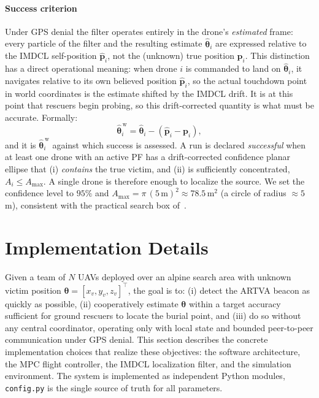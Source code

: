 \documentclass[journal,10pt,twocolumn]{IEEEtran}
\begin{document}
\paragraph{Success criterion}
Under GPS denial the filter operates entirely in the drone's
\emph{estimated} frame: every particle of the filter and the resulting estimate
$\hat{\bm{\theta}}_i$ are expressed relative to the IMDCL self-position
$\hat{\mathbf{p}}_i$, not the (unknown) true position $\mathbf{p}_i$.
This distinction has a direct operational meaning: when drone $i$ is
commanded to land on $\hat{\bm{\theta}}_i$, it navigates relative to
its own believed position $\hat{\mathbf{p}}_i$, so the actual touchdown
point in world coordinates is the estimate shifted by the
IMDCL drift.  It is at this point that rescuers begin probing, so
this drift-corrected quantity is what must be accurate.  Formally:
\begin{equation}
  \hat{\bm{\theta}}_i^{\,\mathrm{w}} =
  \hat{\bm{\theta}}_i - (\hat{\mathbf{p}}_i - \mathbf{p}_i),
  \label{eq:drift_correct}
\end{equation}
and it is $\hat{\bm{\theta}}_i^{\,\mathrm{w}}$ against which success is
assessed.  A run is declared \emph{successful} when at least one drone
with an active PF has a drift-corrected confidence planar ellipse that
(i) \emph{contains} the true victim,
and (ii) is sufficiently concentrated, $A_i \le A_{\max}$.  A single drone
is therefore enough to localize the source.  We set the confidence level
to $95\%$ and $A_{\max} = \pi\,(5\,\mathrm{m})^2 \approx 78.5\,\mathrm{m}^2$
(a circle of radius $\approx 5$\,m), consistent with the practical search
box of~\cite{Azzollini2021}.

\section{Implementation Details}
\label{sec:impl}

Given a team of $N$ UAVs deployed over an alpine search area with
unknown victim position $\bm{\theta} = [x_v, y_v, z_v]^\top$, the
goal is to:
(i) detect the ARTVA beacon as quickly as possible,
(ii) cooperatively estimate $\bm{\theta}$ within a target accuracy
sufficient for ground rescuers to locate the burial point, and
(iii) do so without any central coordinator, operating only with
local state and bounded peer-to-peer communication under GPS denial.
This section describes the concrete implementation choices that realize these objectives:
the software architecture, the MPC flight controller, the IMDCL localization filter,
and the simulation environment. 
The system is implemented as independent Python modules,
\texttt{config.py} is the single source of truth for all parameters.
\end{document}
